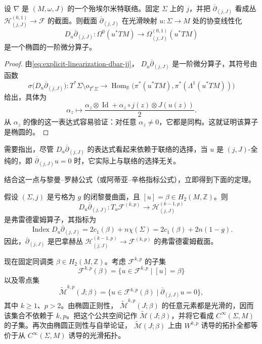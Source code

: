 \begin{proposition}\label{prop:linearization-dbar-elliptic}
设 $\nabla$ 是 $(M,\omega,J)$ 的一个殆埃尔米特联络。固定
$\Sigma$ 上的 $j$，并把 $\overline\partial_{(j,J)}$ 看成丛
$\mathcal H^{(0,1)}_{(j,J)}\to\mathcal F$ 的截面。则截面
$\overline\partial_{(j,J)}$ 在光滑映射 $u:\Sigma\to M$ 处的协变线性化
\[
 D_u\overline\partial_{(j,J)}:
 \Omega^0(u^*TM)\longrightarrow
 \Omega^{(0,1)}_{(j,J)}(u^*TM)
\]
是一个椭圆的一阶微分算子。
\end{proposition}

\begin{proof}
由\eqref{eq:explicit-linearization-dbar-jj}，
$D_u\overline\partial_{(j,J)}$ 是一阶微分算子，其符号由函数
\[
 \sigma\bigl(D_u\overline\partial_{(j,J)}\bigr):
 T^*\Sigma\setminus o_{T^*\Sigma}
 \longrightarrow
 \operatorname{Hom}_{\mathbb R}
 \bigl(\pi^*(u^*TM),\pi^*(\Lambda^1(u^*TM))\bigr)
\]
给出，具体为
\[
 \alpha_z\longmapsto
 \frac{\alpha_z\otimes\operatorname{Id}
 +\alpha_z\circ j(z)\otimes J(u(z))}{2}.
\]
从 $\alpha_z$ 的像的这一表达式容易验证：对任意 $\alpha_z\ne0$，它都是同构。这就证明该算子是椭圆的。
\end{proof}

需要指出，尽管 $D_u\overline\partial_{(j,J)}$ 的表达式看起来依赖于联络的选择，当 $u$ 是 $(j,J)$-全纯的，即
$\overline\partial_{(j,J)}u=0$ 时，它实际上与联络的选择无关。

结合这一点与黎曼--罗赫公式（或阿蒂亚--辛格指标公式），立即得到下面的定理。

\begin{theorem}\label{thm:index-linearized-dbar}
假设 $(\Sigma,j)$ 是亏格为 $g$ 的闭黎曼曲面，且
$[u]=\beta\in H_2(M,\mathbb Z)$。则
\[
 D_u\overline\partial_{(j,J)}:
 T_u\mathcal F^{(k,p)}\longrightarrow\mathcal H_{(j,J)}^{(k-1,p)}
\]
是弗雷德霍姆算子，其指标为
\[
 \operatorname{Index}D_u\overline\partial_{(j,J)}
 =2c_1(\beta)+n\chi(\Sigma)
 =2c_1(\beta)+2n(1-g).
\]
因此，$\overline\partial_{(j,J)}$ 是巴拿赫丛
$\mathcal H_{(j,J)}^{(k-1,p)}\to\mathcal F^{(k,p)}$ 的弗雷德霍姆截面。
\end{theorem}

现在固定同调类 $\beta\in H_2(M,\mathbb Z)$。考虑 $\mathcal F^{k,p}$ 的子集
\[
 \mathcal F^{k,p}(\beta)=
 \{u\in\mathcal F^{k,p}\mid [u]=\beta\}
\]
以及零点集
\[
 \widetilde{\mathcal M}^{k,p}(J;\beta)=
 \{u\in\mathcal F^{k,p}(\beta)
 \mid\overline\partial_{(j,J)}u=0\},
\]
其中 $k\geq1$、$p>2$。由椭圆正则性，
$\widetilde{\mathcal M}^{k,p}(J;\beta)$ 的任意元素都是光滑的，因而该集合不依赖于 $k,p$。把这个公共空间记作
$\widetilde{\mathcal M}(J;\beta)$，并将它看成 $C^\infty(\Sigma,M)$ 的子集。再次由椭圆正则性与自举论证，
$\widetilde{\mathcal M}(J;\beta)$ 上由 $W^{k,p}$ 诱导的拓扑全都等价于从
$C^\infty(\Sigma,M)$ 诱导的光滑拓扑。
